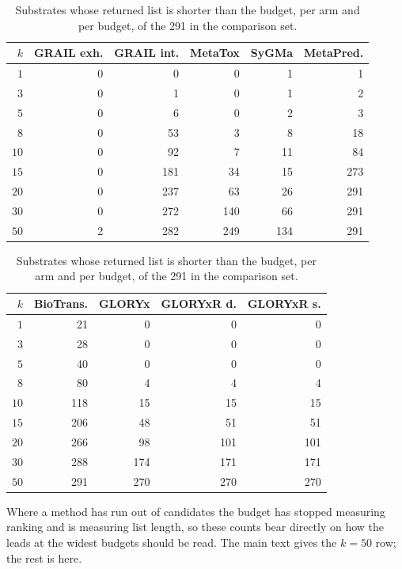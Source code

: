 \begin{table}[h]
\centering\small
\begin{threeparttable}
\caption{Substrates whose returned list is shorter than the budget, per arm and per budget, of the 291 in the comparison set.}
\label{tab:si-short}
\begin{tabular}{rrrrrr}
\toprule
$k$ & GRAIL exh. & GRAIL int. & MetaTox & SyGMa & MetaPred. \\
\midrule
$1$ & 0 & 0 & 0 & 1 & 1 \\
$3$ & 0 & 1 & 0 & 1 & 2 \\
$5$ & 0 & 6 & 0 & 2 & 3 \\
$8$ & 0 & 53 & 3 & 8 & 18 \\
$10$ & 0 & 92 & 7 & 11 & 84 \\
$15$ & 0 & 181 & 34 & 15 & 273 \\
$20$ & 0 & 237 & 63 & 26 & 291 \\
$30$ & 0 & 272 & 140 & 66 & 291 \\
$50$ & 2 & 282 & 249 & 134 & 291 \\
\bottomrule
\end{tabular}

\vspace{5pt}

\begin{tabular}{rrrrr}
\toprule
$k$ & BioTrans. & GLORYx & GLORYxR d. & GLORYxR s. \\
\midrule
$1$ & 21 & 0 & 0 & 0 \\
$3$ & 28 & 0 & 0 & 0 \\
$5$ & 40 & 0 & 0 & 0 \\
$8$ & 80 & 4 & 4 & 4 \\
$10$ & 118 & 15 & 15 & 15 \\
$15$ & 206 & 48 & 51 & 51 \\
$20$ & 266 & 98 & 101 & 101 \\
$30$ & 288 & 174 & 171 & 171 \\
$50$ & 291 & 270 & 270 & 270 \\
\bottomrule
\end{tabular}
\begin{tablenotes}[flushleft]\footnotesize
\item Where a method has run out of candidates the budget has stopped measuring ranking and is measuring list length, so these counts bear directly on how the leads at the widest budgets should be read. The main text gives the $k=50$ row; the rest is here.
\end{tablenotes}
\end{threeparttable}
\end{table}
